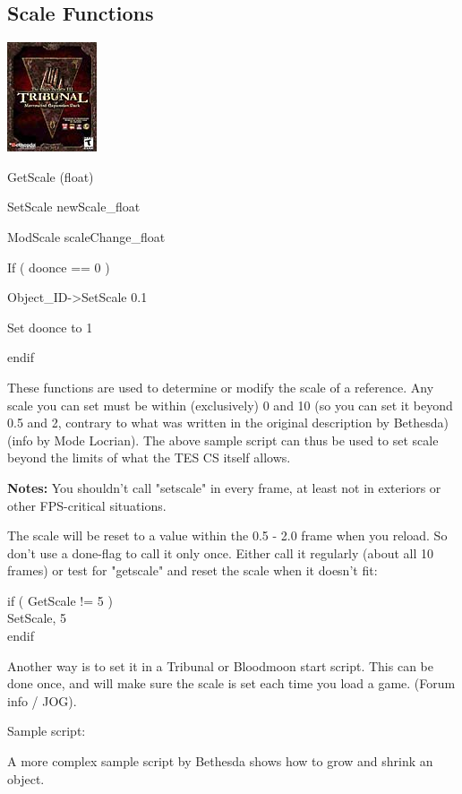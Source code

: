 \documentclass[
]{article}
\begin{document}
\hypertarget{scale-functions}{%
\subsection{\texorpdfstring{\hfill\break
Scale Functions}{ Scale Functions}}\label{scale-functions}}

\includegraphics{media/image6.png}

GetScale (float)

SetScale newScale\_float

ModScale scaleChange\_float

If ( doonce == 0 )

Object\_ID-\textgreater SetScale 0.1

Set doonce to 1

endif

These functions are used to determine or modify the scale of a
reference. Any scale you can set must be within (exclusively) 0 and 10
(so you can set it beyond 0.5 and 2, contrary to what was written in the
original description by Bethesda) (info by Mode Locrian). The above
sample script can thus be used to set scale beyond the limits of what
the TES CS itself allows.

\textbf{Notes:} You shouldn't call "setscale" in every frame, at least
not in exteriors or other FPS-critical situations.

The scale will be reset to a value within the 0.5 - 2.0 frame when you
reload. So don't use a done-flag to call it only once. Either call it
regularly (about all 10 frames) or test for "getscale" and reset the
scale when it doesn't fit:

if ( GetScale != 5 )\\
SetScale, 5\\
endif

Another way is to set it in a Tribunal or Bloodmoon start script. This
can be done once, and will make sure the scale is set each time you load
a game. (Forum info / JOG).

Sample script:

A more complex sample script by Bethesda shows how to grow and shrink an
object.
\end{document}

